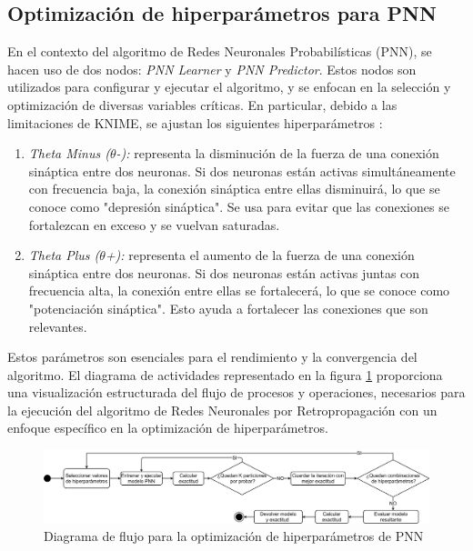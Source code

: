 \subsection{Optimización de hiperparámetros para PNN}
En el contexto del algoritmo de Redes Neuronales Probabilísticas (PNN), se hacen uso de dos nodos: \textit{PNN Learner} y \textit{PNN Predictor}. Estos nodos son utilizados para configurar y ejecutar el algoritmo, y se enfocan en la selección y optimización de diversas variables críticas. En particular, debido a las limitaciones de KNIME, se ajustan los siguientes hiperparámetros \citep{montavon2012neural}:

	\begin{enumerate}
		\item \textit{Theta Minus ($\theta$-):} representa la disminución de la fuerza de una conexión sináptica entre dos neuronas. Si dos neuronas están activas simultáneamente con frecuencia baja, la conexión sináptica entre ellas disminuirá, lo que se conoce como "depresión sináptica". Se usa para evitar que las conexiones se fortalezcan en exceso y se vuelvan saturadas.
		\item \textit{Theta Plus ($\theta$+):} representa el aumento de la fuerza de una conexión sináptica entre dos neuronas. Si dos neuronas están activas juntas con frecuencia alta, la conexión entre ellas se fortalecerá, lo que se conoce como "potenciación sináptica". Esto ayuda a fortalecer las conexiones que son relevantes.
\end{enumerate}

Estos parámetros son esenciales para el rendimiento y la convergencia del algoritmo. El diagrama de actividades representado en la figura \ref{fig:optimizacion-pnn} proporciona una visualización estructurada del flujo de procesos y operaciones, necesarios para la ejecución del algoritmo de Redes Neuronales por Retropropagación con un enfoque específico en la optimización de hiperparámetros.

\begin{figure}[H]
	\centering
	\includegraphics[width=1\linewidth]{"figuras/capi 2/hpo/Optimizacion PNN"}
	\caption{Diagrama de flujo para la optimización de hiperparámetros de PNN}
	\label{fig:optimizacion-pnn}
\end{figure}



